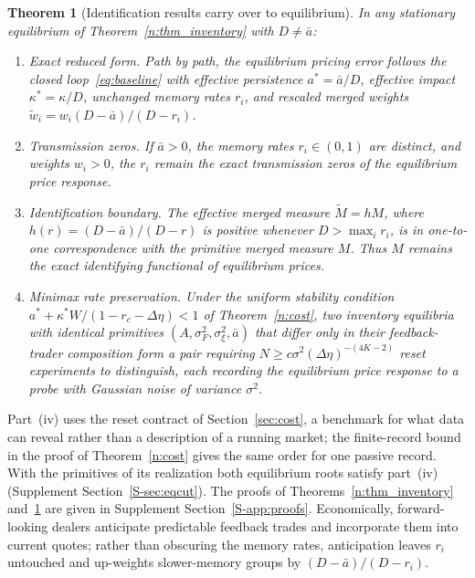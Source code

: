 \documentclass[11pt,letterpaper]{article}
\newtheorem{theorem}{Theorem}[section]
\theoremstyle{definition}
\begin{document}
\begin{theorem}[Identification results carry over to equilibrium]\label{n:thm_eqreduced}
In any stationary equilibrium of Theorem~\ref{n:thm_inventory} with $D \neq \bar{a}$:
\begin{enumerate}
  \item[(i)] \emph{Exact reduced form.} Path by path, the equilibrium pricing error follows the closed loop~\eqref{eq:baseline} with effective persistence $a^* = \bar{a}/D$, effective impact $\kappa^* = \kappa/D$, unchanged memory rates $r_i$, and rescaled merged weights $\tilde{w}_i = w_i (D - \bar{a})/(D - r_i)$.
  \item[(ii)] \emph{Transmission zeros.} If $\bar{a} > 0$, the memory rates $r_i \in (0,1)$ are distinct, and weights $w_i > 0$, the $r_i$ remain the exact transmission zeros of the equilibrium price response.
  \item[(iii)] \emph{Identification boundary.} The effective merged measure $\tilde{M} = h M$, where $h(r) = (D - \bar{a})/(D - r)$ is positive whenever $D > \max_i r_i$, is in one-to-one correspondence with the primitive merged measure $M$. Thus $M$ remains the exact identifying functional of equilibrium prices.
  \item[(iv)] \emph{Minimax rate preservation.} Under the uniform stability condition $a^* + \kappa^* W / (1 - r_c - \Delta\eta) < 1$ of Theorem~\ref{n:cost}, two inventory equilibria with identical primitives $(A, \sigma_F^2, \sigma_\xi^2, \bar{a})$ that differ only in their feedback-trader composition form a pair requiring $N \ge c \sigma^2 (\Delta\eta)^{-(4K-2)}$ reset experiments to distinguish, each recording the equilibrium price response to a probe with Gaussian noise of variance $\sigma^2$.
\end{enumerate}
\end{theorem}

Part~(iv) uses the reset contract of Section~\ref{sec:cost}, a benchmark for what data can reveal rather than a description of a running market; the finite-record bound in the proof of Theorem~\ref{n:cost} gives the same order for one passive record. With the primitives of its realization both equilibrium roots satisfy part~(iv) (Supplement Section~\ref{S-sec:eqcut}). The proofs of Theorems~\ref{n:thm_inventory} and~\ref{n:thm_eqreduced} are given in Supplement Section~\ref{S-app:proofs}. Economically, forward-looking dealers anticipate predictable feedback trades and incorporate them into current quotes; rather than obscuring the memory rates, anticipation leaves $r_i$ untouched and up-weights slower-memory groups by $(D - \bar{a})/(D - r_i)$.
\end{document}
